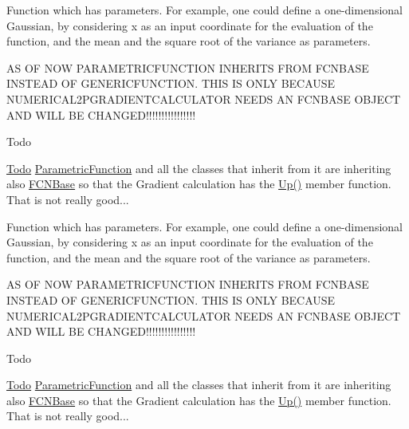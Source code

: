 Function which has parameters. For example, one could define a one-\/dimensional Gaussian, by considering x as an input coordinate for the evaluation of the function, and the mean and the square root of the variance as parameters. 

AS OF N\+OW P\+A\+R\+A\+M\+E\+T\+R\+I\+C\+F\+U\+N\+C\+T\+I\+ON I\+N\+H\+E\+R\+I\+TS F\+R\+OM F\+C\+N\+B\+A\+SE I\+N\+S\+T\+E\+AD OF G\+E\+N\+E\+R\+I\+C\+F\+U\+N\+C\+T\+I\+ON. T\+H\+IS IS O\+N\+LY B\+E\+C\+A\+U\+SE N\+U\+M\+E\+R\+I\+C\+A\+L2\+P\+G\+R\+A\+D\+I\+E\+N\+T\+C\+A\+L\+C\+U\+L\+A\+T\+OR N\+E\+E\+DS AN F\+C\+N\+B\+A\+SE O\+B\+J\+E\+CT A\+ND W\+I\+LL BE C\+H\+A\+N\+G\+E\+D!!!!!!!!!!!!!!!!

\begin{DoxyRefDesc}{Todo}
\item[\mbox{\hyperlink{todo__todo000024}{Todo}}]\mbox{\hyperlink{classROOT_1_1Minuit2_1_1ParametricFunction}{Parametric\+Function}} and all the classes that inherit from it are inheriting also \mbox{\hyperlink{classROOT_1_1Minuit2_1_1FCNBase}{F\+C\+N\+Base}} so that the Gradient calculation has the \mbox{\hyperlink{classROOT_1_1Minuit2_1_1FCNBase_a04ef08ddad92ce8d89d498efbe021c39}{Up()}} member function. That is not really good...\end{DoxyRefDesc}


Function which has parameters. For example, one could define a one-\/dimensional Gaussian, by considering x as an input coordinate for the evaluation of the function, and the mean and the square root of the variance as parameters. 

AS OF N\+OW P\+A\+R\+A\+M\+E\+T\+R\+I\+C\+F\+U\+N\+C\+T\+I\+ON I\+N\+H\+E\+R\+I\+TS F\+R\+OM F\+C\+N\+B\+A\+SE I\+N\+S\+T\+E\+AD OF G\+E\+N\+E\+R\+I\+C\+F\+U\+N\+C\+T\+I\+ON. T\+H\+IS IS O\+N\+LY B\+E\+C\+A\+U\+SE N\+U\+M\+E\+R\+I\+C\+A\+L2\+P\+G\+R\+A\+D\+I\+E\+N\+T\+C\+A\+L\+C\+U\+L\+A\+T\+OR N\+E\+E\+DS AN F\+C\+N\+B\+A\+SE O\+B\+J\+E\+CT A\+ND W\+I\+LL BE C\+H\+A\+N\+G\+E\+D!!!!!!!!!!!!!!!!

\begin{DoxyRefDesc}{Todo}
\item[\mbox{\hyperlink{todo__todo000036}{Todo}}]\mbox{\hyperlink{classROOT_1_1Minuit2_1_1ParametricFunction}{Parametric\+Function}} and all the classes that inherit from it are inheriting also \mbox{\hyperlink{classROOT_1_1Minuit2_1_1FCNBase}{F\+C\+N\+Base}} so that the Gradient calculation has the \mbox{\hyperlink{classROOT_1_1Minuit2_1_1FCNBase_a04ef08ddad92ce8d89d498efbe021c39}{Up()}} member function. That is not really good...\end{DoxyRefDesc}


